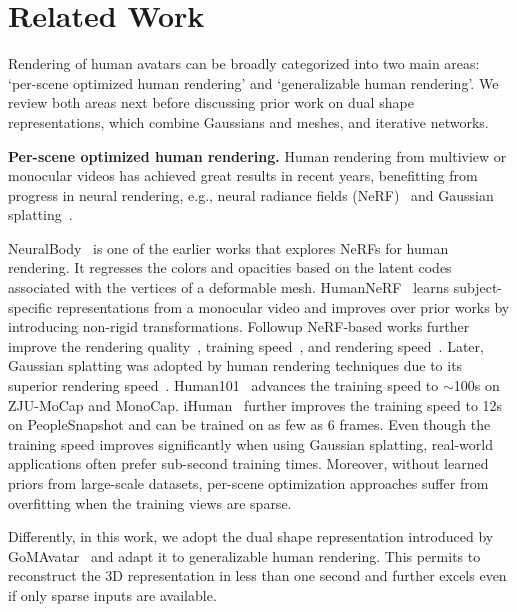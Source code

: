 \section{Related Work}
Rendering of human avatars can be broadly categorized into two main areas: `per-scene optimized human rendering' and `generalizable human rendering'. We review both areas next before discussing prior work on dual shape representations, which combine Gaussians and meshes, and iterative networks. 

\textbf{Per-scene optimized human rendering.} Human rendering from multiview or monocular videos has achieved great results in recent years, benefitting from  progress in neural rendering, e.g., neural radiance fields (NeRF)~\citep{Mildenhall2020NeRFRS} and Gaussian splatting~\citep{kerbl3Dgaussians}.

NeuralBody~\citep{peng2021neural} is one of the earlier works that explores NeRFs for human rendering. It regresses the colors and opacities based on the latent codes associated with the vertices of a deformable mesh. HumanNeRF~\citep{Weng2022HumanNeRFFR}  learns subject-specific representations from a monocular video and improves over prior works by introducing non-rigid transformations.
Followup NeRF-based works further improve the rendering quality~\citep{yu2023monohuman}, training speed~\citep{geng2023learning, jiang2023instantavatar}, and rendering speed~\citep{jiang2023instantavatar}. %
Later, Gaussian splatting was adopted by human rendering techniques due to its superior rendering speed~\citep{lei2024gart, wen2024gomavatar, hu2024gaussianavatar, kocabas2024hugs, li2023human101, paudel2024ihuman}. 
Human101~\citep{li2023human101} advances the training speed to $\sim$100s on ZJU-MoCap and MonoCap. iHuman~\citep{paudel2024ihuman} further improves the training speed to 12s on PeopleSnapshot and can be trained on as few as 6 frames.
Even though the training speed improves significantly when using Gaussian splatting, real-world applications often prefer sub-second training times. Moreover, without learned priors from large-scale datasets,  per-scene optimization approaches suffer from overfitting when the training views are sparse.

Differently, in this work, we adopt the dual shape representation introduced by GoMAvatar~\citep{wen2024gomavatar} and adapt it to generalizable human rendering. This permits to  reconstruct the 3D representation in less than one second and further excels even if only sparse inputs are available. %

